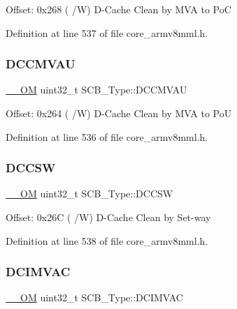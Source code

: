 Offset\+: 0x268 ( /W) D-\/\+Cache Clean by M\+VA to PoC 

Definition at line 537 of file core\+\_\+armv8mml.\+h.

\mbox{\label{struct_s_c_b___type_aae3caeea159ab54859ea11397f942cfa}} 
\subsubsection{\texorpdfstring{D\+C\+C\+M\+V\+AU}{DCCMVAU}}
{\footnotesize\ttfamily \hyperlink{core__sc300_8h_a0ea2009ed8fd9ef35b48708280fdb758}{\+\_\+\+\_\+\+OM} uint32\+\_\+t S\+C\+B\+\_\+\+Type\+::\+D\+C\+C\+M\+V\+AU}

Offset\+: 0x264 ( /W) D-\/\+Cache Clean by M\+VA to PoU 

Definition at line 536 of file core\+\_\+armv8mml.\+h.

\mbox{\label{struct_s_c_b___type_ab95cc818be9fa7d25ae516f3fe6b7788}} 
\subsubsection{\texorpdfstring{D\+C\+C\+SW}{DCCSW}}
{\footnotesize\ttfamily \hyperlink{core__sc300_8h_a0ea2009ed8fd9ef35b48708280fdb758}{\+\_\+\+\_\+\+OM} uint32\+\_\+t S\+C\+B\+\_\+\+Type\+::\+D\+C\+C\+SW}

Offset\+: 0x26C ( /W) D-\/\+Cache Clean by Set-\/way 

Definition at line 538 of file core\+\_\+armv8mml.\+h.

\mbox{\label{struct_s_c_b___type_a4be79491ab1ed14f3b0237ba7e69063c}} 
\subsubsection{\texorpdfstring{D\+C\+I\+M\+V\+AC}{DCIMVAC}}
{\footnotesize\ttfamily \hyperlink{core__sc300_8h_a0ea2009ed8fd9ef35b48708280fdb758}{\+\_\+\+\_\+\+OM} uint32\+\_\+t S\+C\+B\+\_\+\+Type\+::\+D\+C\+I\+M\+V\+AC}

